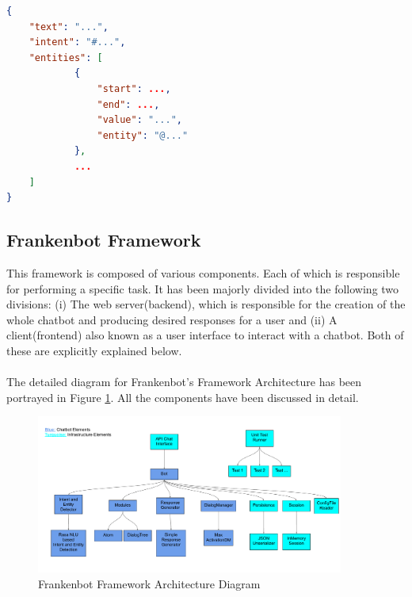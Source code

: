  \begin{lstlisting}[language=json,firstnumber=1]
{
    "text": "...",
    "intent": "#...",
    "entities": [
            {
                "start": ...,
                "end": ...,
                "value": "...",
                "entity": "@..."
            },
            ...
    ]
}
\end{lstlisting}

\subsection{Frankenbot Framework}
This framework is composed of various components. Each of which is responsible for performing a specific task. It has been majorly divided into the following two divisions: (i) The web server(backend), which is responsible for the creation of the whole chatbot and producing desired responses for a user and (ii) A client(frontend) also known as a user interface to interact with a chatbot. Both of these are explicitly explained below.
\\~\\
The detailed diagram for Frankenbot's Framework Architecture has been portrayed in Figure \ref{fig:frankArch}. All the components have been discussed in detail.

\begin{figure}[!h]
    \centering
    \includegraphics[width=0.9\textwidth]{img/Frankenbot_Architecture_Diagram_Updated.pdf}
    \caption{Frankenbot Framework Architecture Diagram}
    \label{fig:frankArch}
\end{figure} 

